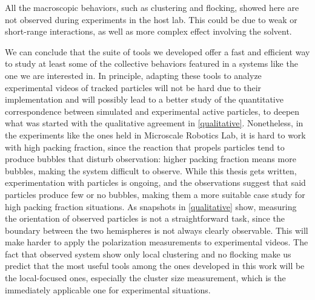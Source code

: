 \documentclass[../../master_thesis_np.tex]{subfiles}
\begin{document}
    All the macroscopic behaviors, such as clustering and flocking, showed here are not observed during experiments in the host lab.
    This could be due to weak or short-range interactions, as well as more complex effect involving the solvent.
    
    
    We can conclude that the suite of tools we developed offer a fast and efficient way to study at least some of the collective behaviors featured in a systems like the one we are interested in.
    In principle, adapting these tools to analyze experimental videos of tracked particles will not be hard due to their implementation and will possibly lead to a better study of the quantitative correspondence between simulated and experimental active particles, to deepen what was started with the qualitative agreement in \ref{qualitative}.
    Nonetheless, in the experiments like the ones held in Microscale Robotics Lab, it is hard to work with high packing fraction, since the  reaction that propels particles tend to produce  bubbles that disturb observation: higher packing fraction means more bubbles, making the system difficult to observe.
    While this thesis gets written, experimentation with  particles is ongoing, and the observations suggest that said particles produce few or no bubbles, making them a more suitable case study for high packing fraction situations.
    As snapshots in \ref{qualitative} show, measuring the orientation of observed particles is not a straightforward task, since the boundary between the two hemispheres is not always clearly observable.
    This will make harder to apply the polarization measurements to experimental videos. 
    The fact that observed system show only local clustering and no flocking make us predict that the most useful tools among the ones developed in this work will be the local-focused ones, especially the cluster size measurement, which is the immediately applicable one for experimental situations.

    
\end{document}
